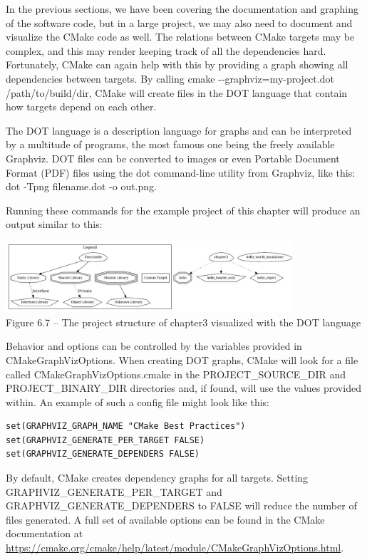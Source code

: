 In the previous sections, we have been covering the documentation and graphing of the software code, but in a large project, we may also need to document and visualize the CMake code as well. The relations between CMake targets may be complex, and this may render keeping track of all the dependencies hard. Fortunately, CMake can again help with this by providing a graph showing all dependencies between targets. By calling cmake -{}-graphviz=my-project.dot /path/to/build/dir, CMake will create files in the DOT language that contain how targets depend on each other.

The DOT language is a description language for graphs and can be interpreted by a multitude of programs, the most famous one being the freely available Graphviz. DOT files can be converted to images or even Portable Document Format (PDF) files using the dot command-line utility from Graphviz, like this: dot -Tpng filename.dot -o out.png.

Running these commands for the example project of this chapter will produce an output similar to this:

\begin{center}
\includegraphics[width=0.8\textwidth]{content/2/chapter6/images/7.jpg}\\
Figure 6.7 – The project structure of chapter3 visualized with the DOT language
\end{center}

Behavior and options can be controlled by the variables provided in CMakeGraphVizOptions. When creating DOT graphs, CMake will look for a file called CMakeGraphVizOptions.cmake in the PROJECT\_SOURCE\_DIR and PROJECT\_BINARY\_DIR directories and, if found, will use the values provided within. An example of such a config file might look like this:

\begin{lstlisting}[style=styleCMake]
set(GRAPHVIZ_GRAPH_NAME "CMake Best Practices")
set(GRAPHVIZ_GENERATE_PER_TARGET FALSE)
set(GRAPHVIZ_GENERATE_DEPENDERS FALSE)
\end{lstlisting}

By default, CMake creates dependency graphs for all targets. Setting GRAPHVIZ\_GENERATE\_PER\_TARGET and GRAPHVIZ\_GENERATE\_DEPENDERS to FALSE will reduce the number of files generated. A full set of available options can be found in the CMake documentation at \url{https://cmake.org/cmake/help/latest/module/CMakeGraphVizOptions.html}.


















